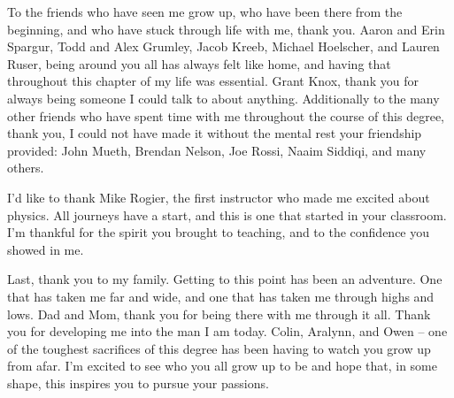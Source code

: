 To the friends who have seen me grow up, who have been there from the beginning, and who have stuck through life with me, thank you. Aaron and Erin Spargur, Todd and Alex Grumley, Jacob Kreeb, Michael Hoelscher, and Lauren Ruser, being around you all has always felt like home, and having that throughout this chapter of my life was essential. Grant Knox, thank you for always being someone I could talk to about anything. Additionally to the many other friends who have spent time with me throughout the course of this degree, thank you, I could not have made it without the mental rest your friendship provided: John Mueth, Brendan Nelson, Joe Rossi, Naaim Siddiqi, and many others.

I'd like to thank Mike Rogier, the first instructor who made me excited about physics. All journeys have a start, and this is one that started in your classroom. I'm thankful for the spirit you brought to teaching, and to the confidence you showed in me. 

Last, thank you to my family. Getting to this point has been an adventure. One that has taken me far and wide, and one that has taken me through highs and lows. Dad and Mom, thank you for being there with me through it all. Thank you for developing me into the man I am today. Colin, Aralynn, and Owen -- one of the toughest sacrifices of this degree has been having to watch you grow up from afar. I'm excited to see who you all grow up to be and hope that, in some shape, this inspires you to pursue your passions.
\\


